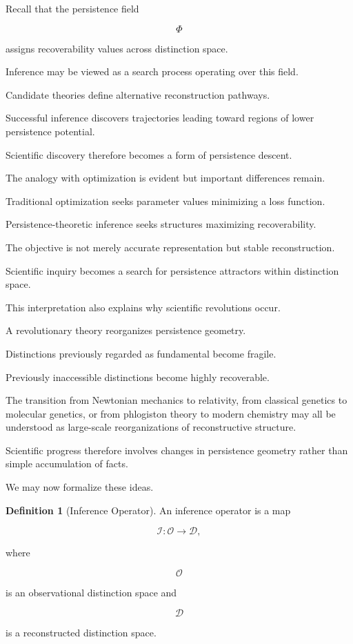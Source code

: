 \documentclass[12pt,oneside]{article}
\theoremstyle{definition}
\newtheorem{definition}[theorem]{Definition} \newtheorem{axiom}[theorem]{Axiom} \newtheorem{remark}[theorem]{Remark} \newtheorem{example}[theorem]{Example}
\begin{document}
Recall that the persistence field

\[
\Phi
\]

assigns recoverability values across distinction space.

Inference may be viewed as a search process operating over this field.

Candidate theories define alternative reconstruction pathways.

Successful inference discovers trajectories leading toward regions of lower persistence potential.

Scientific discovery therefore becomes a form of persistence descent.

The analogy with optimization is evident but important differences remain.

Traditional optimization seeks parameter values minimizing a loss function.

Persistence-theoretic inference seeks structures maximizing recoverability.

The objective is not merely accurate representation but stable reconstruction.

Scientific inquiry becomes a search for persistence attractors within distinction space.

This interpretation also explains why scientific revolutions occur.

A revolutionary theory reorganizes persistence geometry.

Distinctions previously regarded as fundamental become fragile.

Previously inaccessible distinctions become highly recoverable.

The transition from Newtonian mechanics to relativity, from classical genetics to molecular genetics, or from phlogiston theory to modern chemistry may all be understood as large-scale reorganizations of reconstructive structure.

Scientific progress therefore involves changes in persistence geometry rather than simple accumulation of facts.

We may now formalize these ideas.

\begin{definition}[Inference Operator]

An inference operator is a map

\[
\mathcal I :
\mathcal O
\rightarrow
\mathcal D,
\]

where

\[
\mathcal O
\]

is an observational distinction space and

\[
\mathcal D
\]

is a reconstructed distinction space.

\end{definition}
\end{document}
